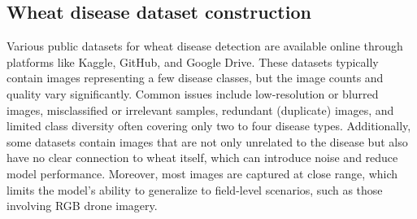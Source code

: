 \subsection{Wheat disease dataset construction}
Various public datasets for wheat disease detection are available online through platforms like Kaggle, GitHub, and Google Drive. These datasets typically contain images representing a few disease classes, but the image counts and quality vary significantly. Common issues include low-resolution or blurred images, misclassified or irrelevant samples, redundant (duplicate) images, and limited class diversity often covering only two to four disease types. Additionally, some datasets contain images that are not only unrelated to the disease but also have no clear connection to wheat itself, which can introduce noise and reduce model performance. Moreover, most images are captured at close range, which limits the model’s ability to generalize to field-level scenarios,  such as those involving RGB drone imagery.
\begin{table}[htbp]
    \caption{Overview of used wheat disease datasets}
    \centering
    \label{tab:wheat-datasets}
\end{table}

